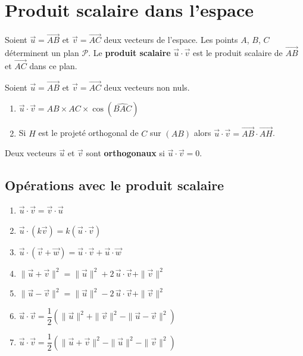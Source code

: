 \documentclass[11pt,a4paper,openany]{book}
\theoremstyle{definition}
\newcommand{\vc}[1]{\overrightarrow{#1}}
\begin{document}
    \section{Produit scalaire dans l'espace}
    \begin{Définition}
        Soient $\vc{u}=\vc{AB}$ et $\vc{v}=\vc{AC}$ deux vecteurs de l'espace.
        Les points $A$, $B$, $C$ déterminent un plan $\mathcal{P}$.
        Le \textbf{produit scalaire} $\vc{u}\cdot\vc{v}$ est le produit scalaire de
        $\vc{AB}$ et $\vc{AC}$ dans ce plan.
    \end{Définition}

    \begin{Propriété}
        Soient $\vc{u}=\vc{AB}$ et $\vc{v}=\vc{AC}$ deux vecteurs non nuls.
        \begin{enumerate}
            \item $\vc{u}\cdot\vc{v}=AB\times AC\times\cos(\widehat{BAC})$
            \item Si $H$ est le projeté orthogonal de $C$ sur $(AB)$ alors
                  $\vc{u}\cdot\vc{v}=\vc{AB}\cdot\vc{AH}$.
        \end{enumerate}
    \end{Propriété}

    \begin{Définition}
        Deux vecteurs $\vc{u}$ et $\vc{v}$ sont \textbf{orthogonaux} si $\vc{u}\cdot\vc{v}=0$.
    \end{Définition}

    \subsection{Opérations avec le produit scalaire}
    \begin{Propriété}
        \begin{enumerate}
            \item $\vc{u}\cdot\vc{v}=\vc{v}\cdot\vc{u}$
            \item $\vc{u}\cdot(k\vc{v})=k(\vc{u}\cdot\vc{v})$
            \item $\vc{u}\cdot(\vc{v}+\vc{w})=\vc{u}\cdot\vc{v}+\vc{u}\cdot\vc{w}$
            \item $\|\vc{u}+\vc{v}\|^2=\|\vc{u}\|^2+2\,\vc{u}\cdot\vc{v}+\|\vc{v}\|^2$
            \item $\|\vc{u}-\vc{v}\|^2=\|\vc{u}\|^2-2\,\vc{u}\cdot\vc{v}+\|\vc{v}\|^2$
            \item $\vc{u}\cdot\vc{v}=\dfrac{1}{2}\!\left(\|\vc{u}\|^2+\|\vc{v}\|^2-\|\vc{u}-\vc{v}\|^2\right)$
            \item $\vc{u}\cdot\vc{v}=\dfrac{1}{2}\!\left(\|\vc{u}+\vc{v}\|^2-\|\vc{u}\|^2-\|\vc{v}\|^2\right)$
        \end{enumerate}
    \end{Propriété}
\end{document}

